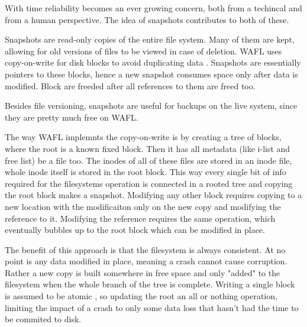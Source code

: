             With time reliability becomes an ever growing concern, both from a
            techincal and from a human perspective. The idea of snapshots
            contributes to both of these.

            Snapshots are read-only copies of the entire file system. Many of
            them are kept, allowing for old versions of files to be viewed in
            case of deletion. WAFL uses copy-on-write for disk blocks to avoid
            duplicating data \cite{WAFL}. Snapshots are essentially pointers to
            these blocks, hence a new snapshot consumes space only after data
            is modified. Block are freeded after all references to them are
            freed too.

            Besides file versioning, snapshots are useful for backups on the
            live system, since they are pretty much free on WAFL.


            The way WAFL implemnts the copy-on-write is by creating a tree of
            blocks, where the root is a known fixed block. Then it has all
            metadata (like i-list and free list) be a file too. The inodes of
            all of these files are stored in an inode file, whole inode itself
            is stored in the root block. This way every single bit of info
            required for the filesystems operation is connected in a rooted
            tree and copying the root block makes a snapshot. Modifying any
            other block requires copying to a new location with the
            modificaiton only on the new copy and modifying the reference to
            it. Modifying the reference requires the same operation, which
            eventually bubbles up to the root block which can be modified in
            place.

            The benefit of this approach is that the filesystem is always
            consistent. At no point is any data modified in place, meaning a
            crash cannot cause corruption. Rather a new copy is built somewhere
            in free space and only "added" to the filesystem when the whole
            branch of the tree is complete. Writing a single block is assumed
            to be atomic \cite{???}, so updating the root an all or nothing
            operation, limiting the impact of a crash to only some data loss
            that hasn't had the time to be commited to disk.


